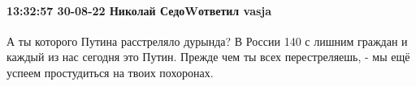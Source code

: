  
 
 
 
 

\paragraph{13:32:57 30-08-22 Николай СедоWответил vasja}

А ты которого Путина расстреляло дурында? В России 140 с лишним граждан и
каждый из нас сегодня это Путин. Прежде чем ты всех перестреляешь, - мы ещё
успеем простудиться на твоих похоронах.

